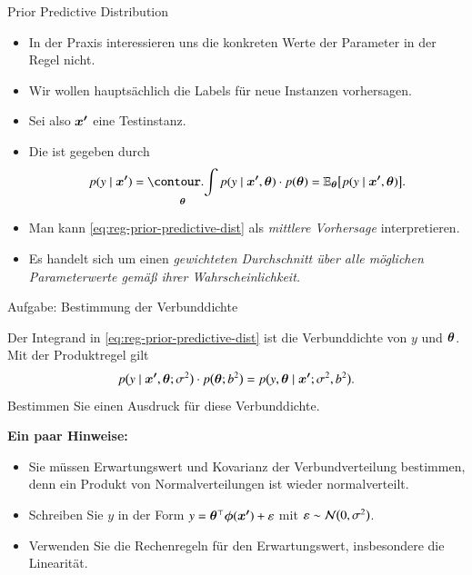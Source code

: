 \begin{frame}{Prior Predictive Distribution}{}
	\begin{itemize}
		\item In der Praxis interessieren uns die konkreten Werte der Parameter in der Regel nicht.
		\item Wir wollen hauptsächlich die Labels für neue Instanzen vorhersagen.
		\item Sei also $\bm{x'}$ eine Testinstanz.
		\item Die  ist gegeben durch
		\begin{equation} \label{eq:reg-prior-predictive-dist}
			p(y \mid \newinst)
				= \int_{\btheta} p(y \mid \newinst, \btheta) \cdot p(\btheta)
				= \E_{\btheta}\bigl[ p(y \mid \newinst, \btheta) \bigr].
		\end{equation}
		\item Man kann \eqref{eq:reg-prior-predictive-dist} als \textit{mittlere Vorhersage} interpretieren.
		\item Es handelt sich um einen \textit{gewichteten Durchschnitt über alle möglichen Parameterwerte gemäß ihrer Wahrscheinlichkeit.}
	\end{itemize}
\end{frame}


\begin{frame}{Aufgabe: Bestimmung der Verbunddichte}{}
	\begin{mytask}
		Der Integrand in \eqref{eq:reg-prior-predictive-dist} ist die Verbunddichte von $y$ und $\bm{\theta}$. Mit der Produktregel gilt
		\begin{equation*}
			p\bigl( y \mid \bm{x'}, \bm{\theta}; \sigma^2 \bigr) \cdot p\bigl( \bm{\theta}; b^2 \bigr) = p\bigl( y, \bm{\theta} \mid \bm{x'}; \sigma^2, b^2 \bigr).
		\end{equation*}
		Bestimmen Sie einen Ausdruck für diese Verbunddichte.
		
		\textbf{Ein paar Hinweise:}
		\begin{itemize}
			\item Sie müssen Erwartungswert und Kovarianz der Verbundverteilung bestimmen,
				denn ein Produkt von Normalverteilungen ist wieder normalverteilt.
			\item Schreiben Sie $y$ in der Form $y = \bm{\theta}^\top \bm{\phi}(\bm{x'}) + \varepsilon$ mit
				$\varepsilon \sim \mathcal{N}\bigl( 0, \sigma^2 \bigr)$.
			\item Verwenden Sie die Rechenregeln für den Erwartungswert, insbesondere die Linearität.
		\end{itemize}
	\end{mytask}
\end{frame}


